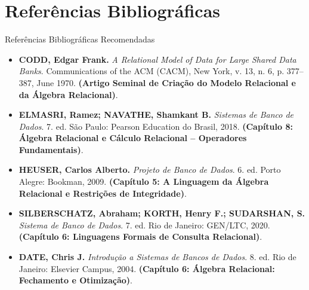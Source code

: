 \section[Referências]{Referências Bibliográficas}

\begin{frame}{Referências Bibliográficas Recomendadas}
  \scriptsize
  \begin{itemize}
    \item \textbf{CODD, Edgar Frank.} \textit{A Relational Model of Data for Large Shared Data Banks}. Communications of the ACM (CACM), New York, v. 13, n. 6, p. 377--387, June 1970. \textbf{(Artigo Seminal de Criação do Modelo Relacional e da Álgebra Relacional)}.
    \item \textbf{ELMASRI, Ramez; NAVATHE, Shamkant B.} \textit{Sistemas de Banco de Dados}. 7. ed. São Paulo: Pearson Education do Brasil, 2018. \textbf{(Capítulo 8: Álgebra Relacional e Cálculo Relacional -- Operadores Fundamentais)}.
    \item \textbf{HEUSER, Carlos Alberto.} \textit{Projeto de Banco de Dados}. 6. ed. Porto Alegre: Bookman, 2009. \textbf{(Capítulo 5: A Linguagem da Álgebra Relacional e Restrições de Integridade)}.
    \item \textbf{SILBERSCHATZ, Abraham; KORTH, Henry F.; SUDARSHAN, S.} \textit{Sistema de Banco de Dados}. 7. ed. Rio de Janeiro: GEN/LTC, 2020. \textbf{(Capítulo 6: Linguagens Formais de Consulta Relacional)}.
    \item \textbf{DATE, Chris J.} \textit{Introdução a Sistemas de Bancos de Dados}. 8. ed. Rio de Janeiro: Elsevier Campus, 2004. \textbf{(Capítulo 6: Álgebra Relacional: Fechamento e Otimização)}.
  \end{itemize}
\end{frame}
